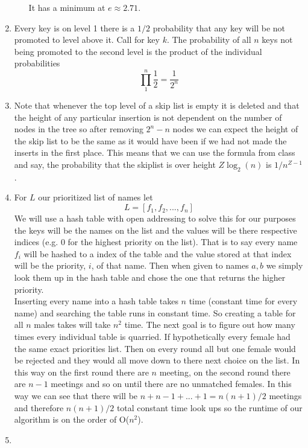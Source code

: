 \documentclass[11pt]{article}
\begin{document}
\begin{enumerate}
\begin{enumerate}
\begin{center}
		\end{center}
			It has a minimum at $e \approx 2.71$.
		
	\end{enumerate}
	\item Every key is on level 1 there is a $1/2$ probability that any key will be not
		promoted to level above it. Call  for key
		$k$. The probability of all $n$ keys
		not being promoted to the second level is the product
		of the individual probabilities 
		$$\prod_1^n \frac{1}{2} =\frac{1}{2^n}$$
	\item Note that whenever the top level of a skip list is empty it is
		deleted and that the height of any particular insertion is not
		dependent on the number of nodes in the tree
		so after removing $2^n - n$ nodes we can expect the height of
		the skip list to be the same as it would have been if we had not
		made the inserts in the first place. This means that we can use
		the formula from class and say, the probability that the skiplist is
		over height $Z\log_2(n)$ is $1/n^{Z-1}$.
	\item For $L$ our prioritized list of names let 
		$$L = [f_1, f_2, ... ,f_n]$$
		We will use a hash table with open addressing to solve this
		for our purposes the keys will be the names on the list and the
		values will be there respective indices (e.g. $0$ for the
		highest priority on the list). That is to say every
		name $f_i$ will be hashed to a index of the table and the value stored
		at that index will be the priority, $i$, of that name.
		Then when given to names $a,b$ we simply look them up in the
		hash table and chose the one that returns the higher priority.\\
		Inserting every name into a hash table takes $n$ time (constant time for
		every name) and searching the table runs in constant time. So
		creating a table for all $n$ males takes will take $n^2$ time.
		The next goal is to figure out how many times every individual
		table is quarried. If hypothetically every female had the same
		exact priorities list. Then on every round all but one
		female would be rejected and they would all move down to there
		next choice on the list. In this way on the first round there
		are $n$ meeting, on the second round there are $n-1$ meetings
		and so on until there are no unmatched females. In this way we
		can see that there will be $n+n-1+...+1 = n(n+1)/2$ meetings and
		therefore $n(n+1)/2$ total constant time look ups so the runtime
		of our algorithm is on the order of O($n^2$).
	\item		

\end{enumerate}
\end{document}
